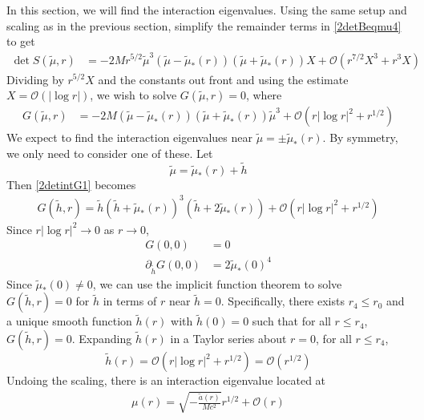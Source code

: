 \documentclass[thesis.tex]{subfiles}
\begin{document}
In this section, we will find the interaction eigenvalues. Using the same setup and scaling as in the previous section, simplify the remainder terms in \cref{2detBeqmu4} to get
\begin{equation}\label{2detint2}
\begin{aligned}
\det S(\tilde{\mu}, r) &= -2 M r^{5/2} \tilde{\mu}^3 (\tilde{\mu} - \tilde{\mu}_*(r)) (\tilde{\mu} + \tilde{\mu}_*(r)) X + \mathcal{O}\left( r^{7/2} X^3 + r^3 X \right)
\end{aligned}
\end{equation}
Dividing by $r^{5/2}X$ and the constants out front and using the estimate $X = \mathcal{O}(|\log r|)$, we wish to solve $G(\tilde{\mu}, r) = 0$, where
\begin{equation}\label{2detintG1}
\begin{aligned}
G(\tilde{\mu}, r) &= -2 M (\tilde{\mu} - \tilde{\mu}_*(r)) (\tilde{\mu} + \tilde{\mu}_*(r))\tilde{\mu}^3 + \mathcal{O}\left( r |\log r|^2 + r^{1/2} \right)
\end{aligned}
\end{equation}
We expect to find the interaction eigenvalues near $\tilde{\mu} = \pm \tilde{\mu}_*(r)$. By symmetry, we only need to consider one of these. Let
\[
\tilde{\mu} = \tilde{\mu}_*(r) + \tilde{h}
\]
Then \cref{2detintG1} becomes
\begin{equation}\label{2detintG2}
\begin{aligned}
G(\tilde{h},r) = \tilde{h} ( \tilde{h} + \tilde{\mu}_*(r))^3 (\tilde{h} + 2 \tilde{\mu}_*(r)) + \mathcal{O}\left( r |\log r|^2 + r^{1/2} \right)
\end{aligned}
\end{equation}
Since $r |\log r|^2  \rightarrow 0$ as $r \rightarrow 0$,
\begin{align*}
G(0, 0) &= 0 \\
\partial_{\tilde{h}} G(0, 0) &= 2 \tilde{\mu}_*(0)^4
\end{align*}
Since $\tilde{\mu}_*(0) \neq 0$, we can use the implicit function theorem to solve $G(\tilde{h},r) = 0$ for $\tilde{h}$ in terms of $r$ near $\tilde{h} = 0$. Specifically, there exists $r_4 \leq r_0$ and a unique smooth function $\tilde{h}(r)$ with $\tilde{h}(0) = 0$ such that for all $r \leq r_4$, $G(\tilde{h}, r) = 0$. Expanding $\tilde{h}(r)$ in a Taylor series about $r = 0$, for all $r \leq r_4$,
\[
\tilde{h}(r) = \mathcal{O}\left( r |\log r|^2 + r^{1/2} \right) = \mathcal{O}\left( r^{1/2} \right)
\]
Undoing the scaling, there is an interaction eigenvalue located at
\begin{align*}
\mu(r) = \sqrt{-\frac{\tilde{a}(r)}{M c^2}}r^{1/2} + \mathcal{O}\left( r \right)
\end{align*}
\end{document}
